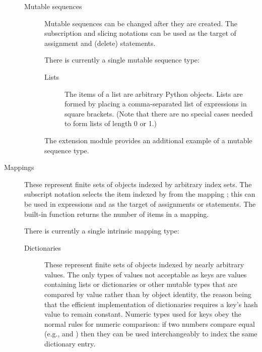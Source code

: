 \begin{description}
\begin{description}
\begin{description}
\end{description} %

\item[Mutable sequences]
Mutable sequences can be changed after they are created.  The
subscription and slicing notations can be used as the target of
assignment and  (delete) statements.

There is currently a single mutable sequence type:

\begin{description}

\item[Lists]
The items of a list are arbitrary Python objects.  Lists are formed
by placing a comma-separated list of expressions in square brackets.
(Note that there are no special cases needed to form lists of length 0
or 1.)

\end{description} %

The extension module  provides an
additional example of a mutable sequence type.


\end{description} %

\item[Mappings]
These represent finite sets of objects indexed by arbitrary index sets.
The subscript notation  selects the item indexed
by  from the mapping ; this can be used in
expressions and as the target of assignments or  statements.
The built-in function  returns the number of items
in a mapping.

There is currently a single intrinsic mapping type:

\begin{description}

\item[Dictionaries]
These represent finite sets of objects indexed by nearly arbitrary
values.  The only types of values not acceptable as keys are values
containing lists or dictionaries or other mutable types that are
compared by value rather than by object identity, the reason being
that the efficient implementation of dictionaries requires a key's
hash value to remain constant.
Numeric types used for keys obey the normal rules for numeric
comparison: if two numbers compare equal (e.g.,  and
) then they can be used interchangeably to index the same
dictionary entry.


\end{description}
\end{description}
